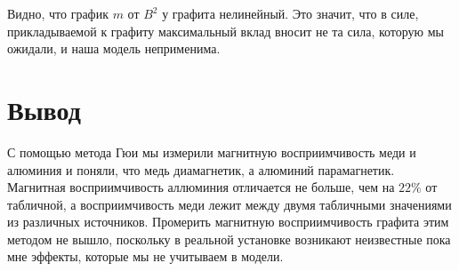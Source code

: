 \documentclass[a4paper,12pt]{article}
\begin{document}
Видно, что график $m$ от $B^2$ у графита нелинейный. Это значит, что в силе, прикладываемой к графиту максимальный вклад вносит не та сила, которую мы ожидали, и наша модель неприменима.

\section*{Вывод}
С помощью метода Гюи мы измерили магнитную восприимчивость меди и алюминия и поняли, что медь диамагнетик, а алюминий парамагнетик. Магнитная восприимчивость аллюминия отличается не больше, чем на $22\%$ от табличной, а восприимчивость меди лежит между двумя табличными значениями из различных источников. Промерить магнитную восприимчивость графита этим методом не вышло, поскольку в реальной установке возникают неизвестные пока мне эффекты, которые мы не учитываем в модели.
\end{document}
